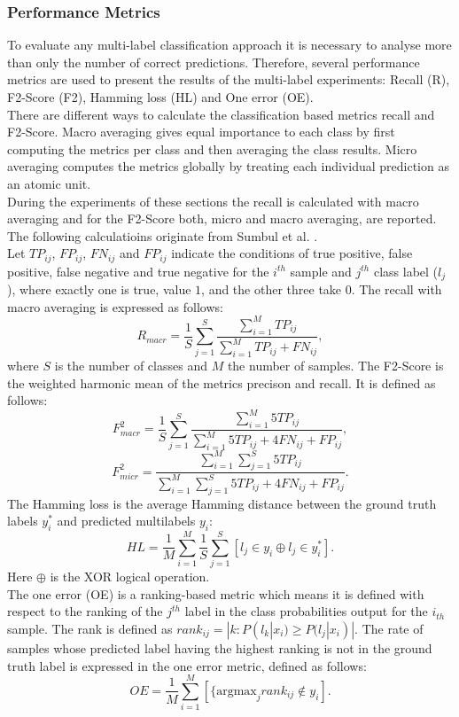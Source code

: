 \subsubsection{Performance Metrics}
To evaluate any multi-label classification approach it is necessary to analyse more than only the number of correct predictions. Therefore, several performance metrics are used to present the results of the multi-label experiments: Recall (R), F2-Score (F2), Hamming loss (HL) and One error (OE).  \\
There are different ways to calculate the classification based metrics recall and F2-Score. Macro averaging gives equal importance to each class by first computing the metrics per class and then averaging the class results. Micro averaging computes the metrics globally by treating each individual prediction as an atomic unit. \cite{benchmark} \\
During the experiments of these sections the recall is calculated with macro averaging and for the F2-Score both, micro and macro averaging, are reported. The following calculatioins originate from Sumbul et al. \cite{benchmark}. \\
Let $TP_{ij}$, $FP_{ij}$, $FN_{ij}$ and $FP_{ij}$ indicate the conditions of true positive, false positive, false negative and true negative for the $i^{th}$ sample and $j^{th}$ class label ($l_j$), where exactly one is true, value $1$, and the other three take $0$. The recall with macro averaging is expressed as follows: 
\begin{equation}
    R_{macr}=\frac{1}{S}\sum_{j=1}^S \frac{\sum_{i=1}^M TP_{ij}}{\sum_{i=1}^M TP_{ij}+FN_{ij}},
\end{equation}
where $S$ is the number of classes and $M$ the number of samples. The F2-Score is the weighted harmonic mean of the metrics precison and recall. It is defined as follows:
\begin{equation}
    F_{macr}^2 = \frac{1}{S}\sum_{j=1}^S \frac{\sum_{i=1}^M 5TP_{ij}}{\sum_{i=1}^M 5TP_{ij}+4FN_{ij} + FP_{ij}},
\end{equation}
\begin{equation}
    F_{micr}^2 = \frac{\sum_{i=1}^M\sum_{j=1}^S 5TP_{ij}}{\sum_{i=1}^M\sum_{j=1}^S 5TP_{ij}+4FN_{ij} + FP_{ij}}.
\end{equation}
The Hamming loss is the average Hamming distance
between the ground truth labels $y_i^*$ and predicted multilabels $y_i$:
\begin{equation}
    HL = \frac{1}{M}\sum_{i=1}^M\frac{1}{S}\sum_{j=1}^S [l_j\in y_i \oplus l_j \in y_i^*].
\end{equation}
Here $\oplus$ is the XOR logical operation. \\
The one error (OE) is a ranking-based metric which means it is defined with respect to the ranking of the $j^{th}$ label in the class probabilities output for the $i_{th}$ sample. The rank is defined as $rank_{ij}=|k:P(l_k|x_i)\geq P(l_j|x_i)|$. The rate of samples whose predicted label having the highest ranking is not in the ground truth label is expressed in the one error metric, defined as follows:
\begin{equation}
    OE = \frac{1}{M}\sum_{i=1}^M[\{\text{argmax}_j rank_{ij}\not\in y_i].
\end{equation}

